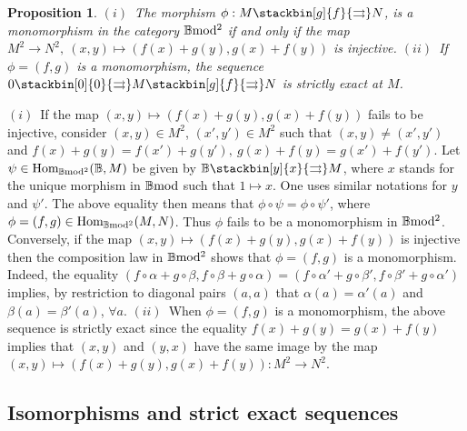 \documentclass[12pt]{article}
\newtheorem{prop}[thm]{Proposition}
\def\Hom{{\rm Hom}}
\def\B{{\mathbb B}}
\def\strg{strict }
\def\strgly{strictly }
\def\Hom {{\mbox{Hom}}}
\def\bmod{{\rm \B mod}}
\def\bm2{{\rm \B mod^2}}
\begin{document}
      \begin{prop}\label{monomorphism}$(i)$~The  morphism $\phi:M\stackbin[g]{f}{\rightrightarrows}N$, is a monomorphism in the category $\bm2$
if and only if the map $M^2\to N^2,~(x,y)\mapsto (f(x)+g(y), g(x)+f(y))$ is injective.\newline 
$(ii)$~If $\phi=(f,g)$ is  a monomorphism, the sequence $0 \stackbin[0]{0}{\rightrightarrows}M\stackbin[g]{f}{\rightrightarrows}N$ is  \strgly exact at $M$.
\end{prop}
   \proof $(i)$~If the map $(x,y)\mapsto (f(x)+g(y),g(x)+f(y))$ fails to be injective, consider $(x,y)\in M^2$, $(x',y')\in M^2$ such that $(x,y)\neq (x',y')$ and
   $
   f(x)+g(y)=f(x')+g(y'),~g(x)+f(y)=g(x')+f(y')
   $.
  Let $\psi\in \Hom_\bm2(\B,M)$ be given by  $\B \stackbin[y]{x}{\rightrightarrows}M$, where $x$ stands for the unique morphism in $\bmod$ such that $1\mapsto x$. One uses similar notations  for $y$ and $\psi'$. The above equality then means that $\phi\circ \psi=\phi \circ \psi'$, where $\phi=(f,g)\in \Hom_\bm2(M,N)$. Thus $\phi$ fails to be a monomorphism in $\bm2$. Conversely, if the map $(x,y)\mapsto (f(x)+g(y), g(x)+f(y))$ is injective then the composition law in $\bm2$ shows that $\phi=(f,g)$ is a monomorphism. Indeed, the equality 
  $
  (f\circ \alpha+g\circ \beta, f\circ \beta+ g\circ \alpha)=
  (f\circ \alpha'+g\circ \beta', f\circ \beta'+ g\circ \alpha')
  $
  implies, by restriction to diagonal pairs $(a,a)$ that $\alpha(a)=\alpha'(a)$ and $\beta(a)=\beta'(a)$, $\forall a$.\newline 
$(ii)$~When $\phi=(f,g)$ is  a monomorphism, the above sequence is  \strgly exact
since the equality $f(x)+g(y)= g(x)+f(y)$ implies that $(x,y)$ and $(y,x)$ have the same image by the map $(x,y)\mapsto (f(x)+g(y),g(x)+f(y)):M^2\to N^2$.
   \endproof 
  


  \subsection{Isomorphisms and \strg exact sequences}\label{sectveryshort}
 
\end{document}
